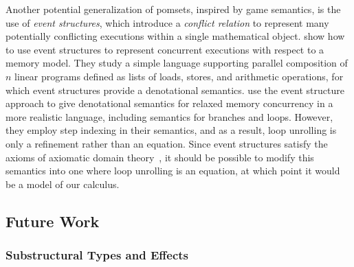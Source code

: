 \documentclass[acmsmall,screen,review]{acmart}
\begin{document}
Another potential generalization of pomsets, inspired by game semantics, is the use of \emph{event
structures}, which introduce a \emph{conflict relation} to represent many potentially conflicting
executions within a single mathematical object. \citet{castellan-16} show how to use event
structures to represent concurrent executions with respect to a memory model. They study a simple
language supporting parallel composition of $n$ linear programs defined as lists of loads, stores,
and arithmetic operations, for which event structures provide a denotational semantics.
\citet{paviotti-modular-relaxed-dep-20} use the event structure approach to give denotational
semantics for relaxed memory concurrency in a more realistic language, including semantics for
branches and loops. However, they employ step indexing in their semantics, and as a result, loop
unrolling is only a refinement rather than an equation. Since event structures satisfy the axioms of
axiomatic domain theory~\cite{fiore-phd-94}, it should be possible to modify this semantics into one
where loop unrolling is an equation, at which point it would be a model of our calculus.

\subsection{Future Work}

\subsubsection{Substructural Types and Effects}
\end{document}
